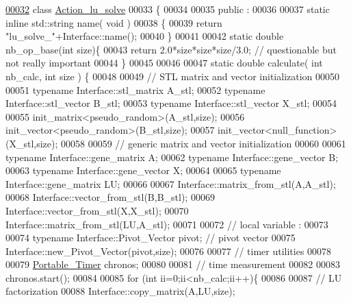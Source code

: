 \begin{DoxyCode}
\hyperlink{class_action__lu__solve}{00032} \textcolor{keyword}{class }\hyperlink{class_action__lu__solve}{Action\_lu\_solve} 
00033 \{
00034 
00035 public :
00036 
00037   \textcolor{keyword}{static} \textcolor{keyword}{inline} std::string name( \textcolor{keywordtype}{void} )
00038   \{
00039     \textcolor{keywordflow}{return} \textcolor{stringliteral}{"lu\_solve\_"}+Interface::name();
00040   \}
00041   
00042   \textcolor{keyword}{static} \textcolor{keywordtype}{double} nb\_op\_base(\textcolor{keywordtype}{int} size)\{
00043     \textcolor{keywordflow}{return} 2.0*size*size*size/3.0;  \textcolor{comment}{// questionable but not really important}
00044   \}
00045 
00046 
00047   \textcolor{keyword}{static} \textcolor{keywordtype}{double} calculate( \textcolor{keywordtype}{int} nb\_calc, \textcolor{keywordtype}{int} size ) \{
00048 
00049     \textcolor{comment}{// STL matrix and vector initialization}
00050     
00051     \textcolor{keyword}{typename} Interface::stl\_matrix A\_stl;
00052     \textcolor{keyword}{typename} Interface::stl\_vector B\_stl;
00053     \textcolor{keyword}{typename} Interface::stl\_vector X\_stl;
00054 
00055     init\_matrix<pseudo\_random>(A\_stl,size);
00056     init\_vector<pseudo\_random>(B\_stl,size);
00057     init\_vector<null\_function>(X\_stl,size);
00058 
00059     \textcolor{comment}{// generic matrix and vector initialization}
00060 
00061     \textcolor{keyword}{typename} Interface::gene\_matrix A;
00062     \textcolor{keyword}{typename} Interface::gene\_vector B;
00063     \textcolor{keyword}{typename} Interface::gene\_vector X;
00064 
00065     \textcolor{keyword}{typename} Interface::gene\_matrix LU; 
00066 
00067     Interface::matrix\_from\_stl(A,A\_stl);
00068     Interface::vector\_from\_stl(B,B\_stl);
00069     Interface::vector\_from\_stl(X,X\_stl);
00070     Interface::matrix\_from\_stl(LU,A\_stl);
00071   
00072     \textcolor{comment}{// local variable :}
00073 
00074     \textcolor{keyword}{typename} Interface::Pivot\_Vector pivot; \textcolor{comment}{// pivot vector}
00075     Interface::new\_Pivot\_Vector(pivot,size);
00076     
00077     \textcolor{comment}{// timer utilities}
00078 
00079     \hyperlink{class_portable___timer}{Portable\_Timer} chronos;
00080 
00081     \textcolor{comment}{// time measurement}
00082 
00083     chronos.start();
00084     
00085     \textcolor{keywordflow}{for} (\textcolor{keywordtype}{int} ii=0;ii<nb\_calc;ii++)\{
00086 
00087       \textcolor{comment}{// LU factorization}
00088       Interface::copy\_matrix(A,LU,size);

\end{DoxyCode}

